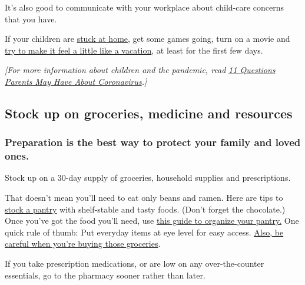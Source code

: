 It's also good to communicate with your workplace about child-care
concerns that you have.

If your children are
\href{https://parenting.nytimes.com/preschooler/coronavirus-schools-lessons?module=latest-filters-feed\&action=click\&rank=3\&position=5}{stuck
at home}, get some games going, turn on a movie and
\href{https://parenting.nytimes.com/childrens-health/coronavirus-parents-need-to-know?module=latest-filters-feed\&action=click\&rank=5\&position=5}{try
to make it feel a little like a vacation}, at least for the first few
days.

\emph{{[}For more information about children and the pandemic, read}
\href{https://www.nytimes.com/2020/03/09/parenting/coronavirus-parents-need-to-know.html}{\emph{11
Questions Parents May Have About Coronavirus}}\emph{.{]}}

\hypertarget{stock-up-on-groceries-medicine-and-resources}{%
\subsection{Stock up on groceries, medicine and
resources}\label{stock-up-on-groceries-medicine-and-resources}}

\hypertarget{preparation-is-the-best-way-to-protect-your-family-and-loved-ones}{%
\subsubsection{\texorpdfstring{\textbf{Preparation is the best way to
protect your family and loved
ones.}}{Preparation is the best way to protect your family and loved ones.}}\label{preparation-is-the-best-way-to-protect-your-family-and-loved-ones}}

Stock up on a 30-day supply of groceries, household supplies and
prescriptions.

That doesn't mean you'll need to eat only beans and ramen. Here are tips
to
\href{https://www.nytimes.com/2020/03/06/dining/how-to-stock-a-pantry.html}{stock
a pantry} with shelf-stable and tasty foods. (Don't forget the
chocolate.) Once you've got the food you'll need, use
\href{https://www.nytimes.com/2020/04/06/realestate/virus-organize-pantry-tips.html}{this
guide to organize your pantry.} One quick rule of thumb: Put everyday
items at eye level for easy access.
\href{https://www.nytimes.com/2020/03/26/well/eat/coronavirus-shopping-food-groceries-infection.html}{Also,
be careful when you're buying those groceries}.

If you take prescription medications, or are low on any over-the-counter
essentials, go to the pharmacy sooner rather than later.

